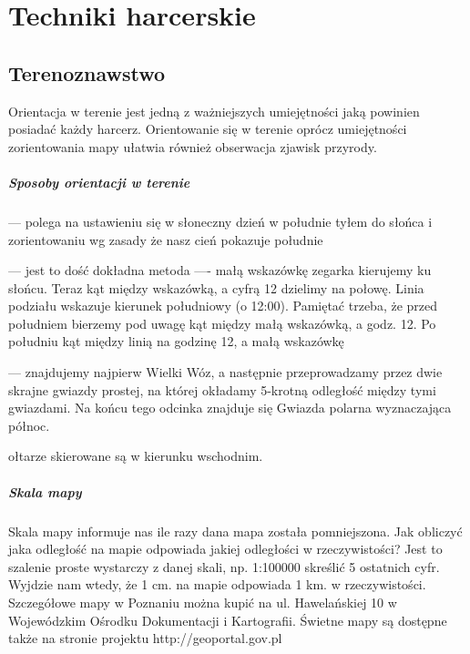 \chapter{Techniki harcerskie}

\section{Terenoznawstwo}

Orientacja w terenie jest jedną z ważniejszych umiejętności jaką powinien posiadać każdy harcerz. Orientowanie się w terenie oprócz umiejętności zorientowania mapy ułatwia również obserwacja zjawisk przyrody. 
\paragraph{Sposoby orientacji w terenie}
\begin{description} 

\item[Według położenia słońca] --- polega na ustawieniu się w słoneczny dzień w południe tyłem do słońca i zorientowaniu wg zasady że nasz cień pokazuje południe
\item[Według słońca i zegarka] --- jest to dość dokładna metoda ---- małą wskazówkę zegarka kierujemy ku słońcu. 
Teraz kąt między wskazówką, a cyfrą 12 dzielimy na połowę. Linia podziału wskazuje kierunek południowy (o 12:00). 
Pamiętać trzeba, że przed południem bierzemy pod uwagę kąt między małą wskazówką, a godz. 12. Po południu kąt między linią na godzinę 12, a małą wskazówkę
\item[Według gwiazdy polarnej] --- znajdujemy najpierw Wielki Wóz, a następnie przeprowadzamy przez dwie skrajne gwiazdy prostej, na której okładamy 5-krotną odległość między tymi gwiazdami. 
Na końcu tego odcinka znajduje się Gwiazda polarna wyznaczająca północ.
\item[W starych kościołach] ołtarze skierowane są w kierunku wschodnim.

\end{description}
\paragraph{Skala mapy}

Skala mapy informuje nas ile razy dana mapa została pomniejszona. Jak obliczyć jaka odległość na mapie odpowiada jakiej odległości w rzeczywistości? Jest to szalenie proste wystarczy z danej skali, np. 1:100000 skreślić 5 ostatnich cyfr. Wyjdzie nam wtedy, że 1 cm. na mapie odpowiada 1 km. w rzeczywistości. Szczegółowe mapy w Poznaniu można kupić na ul. Hawelańskiej 10 w Wojewódzkim Ośrodku Dokumentacji i Kartografii. Świetne mapy są dostępne także na stronie projektu http://geoportal.gov.pl

